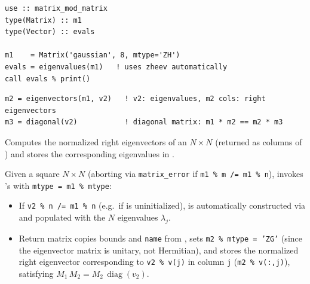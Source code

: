 \begin{description}[leftmargin=2.2cm, style=nextline]
\end{description}

\lstset{language=[95]Fortran}
\begin{lstlisting}
use :: matrix_mod_matrix
type(Matrix) :: m1
type(Vector) :: evals

m1    = Matrix('gaussian', 8, mtype='ZH')
evals = eigenvalues(m1)   ! uses zheev automatically
call evals % print()
\end{lstlisting}


\lstset{language=[95]Fortran}
\begin{lstlisting}
m2 = eigenvectors(m1, v2)   ! v2: eigenvalues, m2 cols: right eigenvectors
m3 = diagonal(v2)           ! diagonal matrix: m1 * m2 == m2 * m3
\end{lstlisting}

Computes the normalized right eigenvectors of an $N \times N$   (returned as columns of ) and stores the corresponding eigenvalues in .

Given a square $N \times N$   (aborting via \texttt{matrix\_error} if \texttt{m1 \% m /= m1 \% n}),  invokes 's  with \texttt{mtype = m1 \% mtype}:
\begin{itemize}
  \item If \texttt{v2 \% n /= m1 \% n} (e.g.\ if  is uninitialized),  is automatically constructed via  and populated with the $N$ eigenvalues $\lambda_j$.
  \item Return matrix  copies bounds and \texttt{name} from , sets \texttt{m2 \% mtype = 'ZG'} (since the eigenvector matrix is unitary, not Hermitian), and stores the normalized right eigenvector corresponding to \texttt{v2 \% v(j)} in column \texttt{j} (\texttt{m2 \% v(:,j)}), satisfying $M_1\, M_2 = M_2\, \operatorname{diag}(v_2)$.
\end{itemize}

